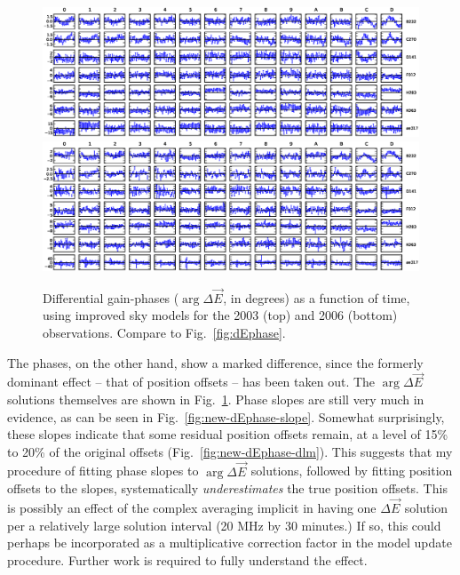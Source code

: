 \documentclass[]{aa}
\newcommand{\jones}[2]{\vec {#1}_{#2}}
\begin{document}
\begin{figure}
\sidecaption
\parbox[b]{12cm}{
\includegraphics[width=12cm]{o2003new_dEphase_mean}
\includegraphics[width=12cm]{o2006new_dEphase_mean}
}
\caption{\label{fig:new-dEphase}Differential gain-phases ($\arg\Delta\jones{E}{}$, in degrees) as a function of time, using improved sky models for the 2003 (top) and 2006 (bottom) observations. Compare to Fig.~\ref{fig:dEphase}.}
\end{figure}

The phases, on the other hand, show a marked difference, since the formerly dominant effect -- that of position offsets -- has been taken out. The $\arg\Delta\jones{E}{}$ solutions themselves are shown in Fig.~\ref{fig:new-dEphase}. Phase slopes are still very much in evidence, as can be seen in Fig.~\ref{fig:new-dEphase-slope}. Somewhat surprisingly, these slopes indicate that some residual position offsets remain, at a level of 15\% to 20\% of the original offsets (Fig.~\ref{fig:new-dEphase-dlm}). This suggests that my procedure of fitting phase slopes to $\arg\Delta\jones{E}{}$ solutions, followed by fitting position offsets to the slopes, systematically \emph{underestimates} the true position offsets. This is possibly an effect of the complex averaging implicit in having one $\Delta\jones{E}{}$ solution per a relatively large solution interval (20 MHz by 30 minutes.) If so, this could perhaps be incorporated as a multiplicative correction factor in the model update procedure. Further work is required to fully understand the effect. 

\end{document}
